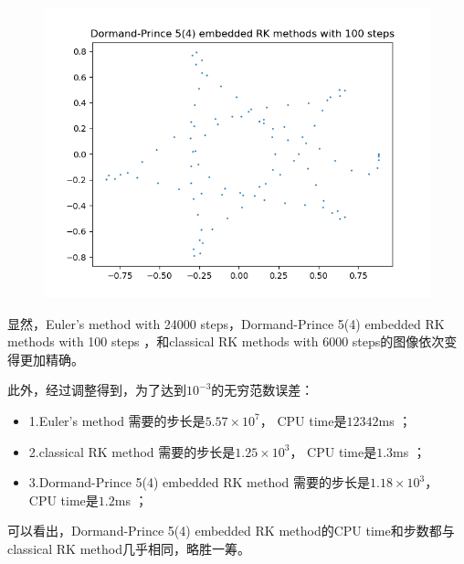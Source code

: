 \documentclass{ctexart}
\begin{document}
\begin{sloppypar}
\begin{figure}[H]
\end{figure}
\begin{figure}[H]
\centering
\includegraphics[scale = 0.45]{./report_src/Figure_78.png}
\end{figure}

显然，Euler's method with 24000 steps，Dormand-Prince 5(4) embedded RK methods with 100 steps ，和classical RK methods with 6000 steps的图像依次变得更加精确。

此外，经过调整得到，为了达到$10^{-3}$的无穷范数误差：
\begin{itemize}
    \item 1.Euler's method 需要的步长是$5.57 \times 10^7$， CPU time是$12342$ms ；
    \item 2.classical RK method 需要的步长是$1.25 \times 10^3$， CPU time是$1.3$ms ；
    \item 3.Dormand-Prince 5(4) embedded RK method 需要的步长是$1.18 \times 10^3$， CPU time是$1.2$ms ；
\end{itemize}
可以看出，Dormand-Prince 5(4) embedded RK method的CPU time和步数都与classical RK method几乎相同，略胜一筹。

\end{sloppypar}
\end{document}

